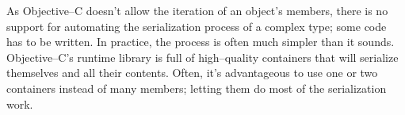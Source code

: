 As Objective--C doesn't allow the iteration of an object's members, there is
no support for automating the serialization process of a complex type; some
code has to be written. In practice, the process is often much simpler than it
sounds. Objective--C's runtime library is full of high--quality containers
that will serialize themselves and all their contents. Often, it's
advantageous to use one or two containers instead of many members; letting
them do most of the serialization work.

%
%
%

